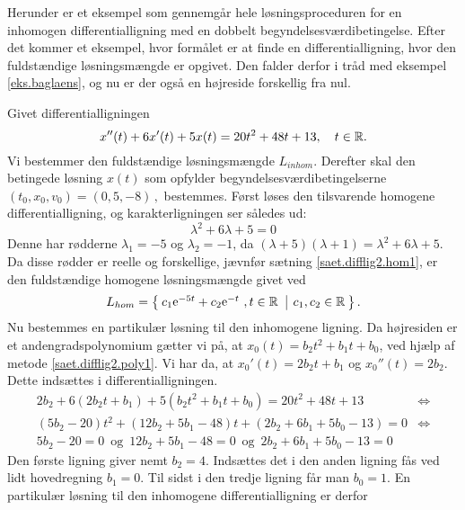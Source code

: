 Herunder er et eksempel som gennemgår hele løsningsproceduren for en inhomogen differentialligning med en dobbelt begyndelsesværdibetingelse. Efter det kommer et eksempel, hvor formålet er at finde en differentialligning, hvor den fuldstændige løs\-nings\-mæng\-de er opgivet. Den falder derfor i tråd med eksempel \ref{eks.baglaens}, og nu er der også en højreside forskellig fra nul.

\begin{example} \label{eks.difflig2.eksent21}
Givet differentialligningen
\begin{equation}
x''(t) + 6x'(t) + 5x(t) = 20t^2 + 48t + 13, \quad t \in \mathbb{R}.
\end{equation}
Vi bestemmer den fuldstændige løsningsmængde $ L_{inhom} $. Derefter skal den betingede løsning $ x(t)$ som opfylder begyndelsesværdibetingelserne $ (t_0,x_0,v_0) = (0,5,-8)\,, $ bestemmes.\bs
Først løses den tilsvarende homogene differentialligning, og karakterligningen ser således ud:
\begin{equation}
\lambda^2 + 6\lambda + 5 = 0
\end{equation}
Denne har rødderne $ \lambda_1 = -5 $ og $ \lambda_2 = -1 $, da $ (\lambda + 5)(\lambda + 1) = \lambda^2 + 6\lambda + 5 $. Da disse rødder er reelle og forskellige, jævnfør sætning \ref{saet.difflig2.hom1}, er den fuldstændige homogene løsningsmængde givet ved
\begin{equation}
L_{hom} = \left\lbrace \hspace*{-1mm} \begin{array}{c|c} c_1 \mathrm{e}^{-5t} + c_2 \mathrm{e}^{-t}\,\,,t \in \mathbb{R}\, & c_1,c_2 \in \mathbb{R} \end{array} \hspace*{-1mm} \right\rbrace.
\end{equation}
Nu bestemmes en partikulær løsning til den inhomogene ligning. Da højresiden er et andengradspolynomium gætter vi på, at $ x_{0}(t) = b_2t^2 + b_1t + b_0 $, ved hjælp af metode \ref{saet.difflig2.poly1}. Vi har da, at $ x_{0}'(t) = 2b_2t + b_1 $ og $ x_{0}''(t) = 2b_2 $. Dette indsættes i differentialligningen.
\begin{equation}
\begin{aligned}
2b_2 + 6(2b_2t + b_1) + 5(b_2t^2 + b_1t + b_0) = 20t^2 + 48t + 13 &\Leftrightarrow \\
(5b_2 - 20)t^2 + (12b_2 + 5b_1 - 48)t + (2b_2 + 6b_1 + 5b_0 - 13) = 0 &\Leftrightarrow \\
5b_2 - 20 = 0 \,\,\,\mathrm{og}\,\,\, 12b_2 + 5b_1 - 48 = 0 \,\,\,\mathrm{og}\,\,\, 2b_2 + 6b_1 + 5b_0 - 13 = 0 & 
\end{aligned}
\end{equation}
Den første ligning giver nemt $ b_2 = 4 $. Indsættes det i den anden ligning fås ved lidt hovedregning $ b_1 = 0 $. Til sidst i den tredje ligning får man $ b_0 = 1 $. En partikulær løsning til den inhomogene differentialligning er derfor

\end{example}
